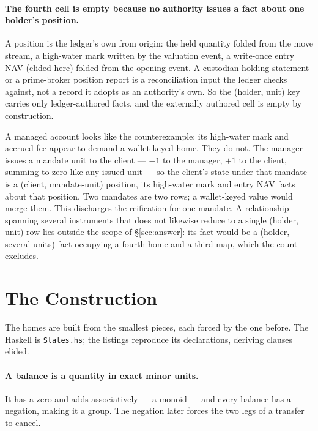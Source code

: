 \documentclass[11pt,a4paper]{article}
\begin{document}
\paragraph{The fourth cell is empty because no authority issues a fact about one
holder's position.}
A position is the ledger's own from origin: the held quantity folded from the move
stream, a high-water mark written by the valuation event, a write-once entry NAV
(elided here) folded from the opening event. A custodian holding statement or a
prime-broker position report is a reconciliation input the ledger checks against, not a
record it adopts as an authority's own. So the (holder, unit) key carries only
ledger-authored facts, and the externally authored cell is empty by construction.

A managed account looks like the counterexample: its high-water mark and accrued
fee appear to demand a wallet-keyed home. They do not. The manager issues a
mandate unit to the client --- $-1$ to the manager, $+1$ to the client, summing to
zero like any issued unit --- so the client's state under that mandate is a (client,
mandate-unit) position, its high-water mark and entry NAV facts about that position.
Two mandates are two rows; a wallet-keyed value would merge them. This discharges the
reification for one mandate. A relationship spanning several instruments that does not
likewise reduce to a single (holder, unit) row lies outside the scope of
\S\ref{sec:answer}: its fact would be a (holder, several-units) fact occupying a fourth
home and a third map, which the count excludes.

\section{The Construction}
\label{sec:construction}

The homes are built from the smallest pieces, each forced by the one before. The
Haskell is \texttt{States.hs}; the listings reproduce its declarations, deriving
clauses elided.

\paragraph{A balance is a quantity in exact minor units.}
It has a zero and adds associatively --- a monoid --- and every balance has a
negation, making it a group. The negation later forces the two legs of a transfer
to cancel.
\end{document}
